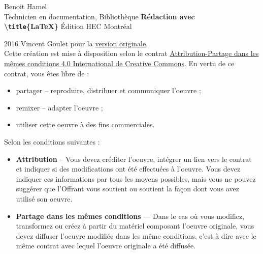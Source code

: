 
\begin{frame}
	
	{\footnotesize Benoit Hamel \\
	Technicien en documentation, Bibliothèque}
	\vfill
	{\Huge\bfseries Rédaction avec \\
	\textbackslash \texttt{title}\{\textrm{\LaTeX}\}}
	\vfill
	{\footnotesize Édition HEC Montréal}
	
\end{frame}


\begin{frame}
	
	\footnotesize
	{\faCopyright} 2016 Vincent Goulet pour la \href{https://ctan.org/pkg/formation-latex-ul}{version originale}.
	\\[2ex]
	{\faCreativeCommons} Cette création est mise à disposition selon le contrat
	\href{http://creativecommons.org/licenses/by-sa/4.0/deed.fr}%
	{Attribution-Partage dans les mêmes conditions 4.0 International de Creative Commons}.
	En vertu de ce contrat, vous êtes libre de :
	
	\begin{itemize}
		\item partager -- reproduire, distribuer et communiquer l’oeuvre ;
		\item remixer -- adapter l’oeuvre ;
		\item utiliser cette oeuvre à des fins commerciales.
	\end{itemize}

	Selon les conditions suivantes :
	
	\begin{itemize}
		\item \textbf{Attribution} -- Vous devez créditer l’oeuvre, intégrer un lien vers le contrat et indiquer si des modifications ont été effectuées	à l’oeuvre. Vous devez indiquer ces informations par tous les moyens possibles, mais vous ne pouvez suggérer que l’Offrant vous soutient ou soutient la façon dont vous avez utilisé son oeuvre.
		\item \textbf{Partage dans les mêmes conditions} — Dans le cas où vous modifiez, transformez ou créez à partir du matériel composant l’oeuvre originale, vous devez diffuser l’oeuvre modifiée dans les même conditions, c’est à dire avec le même contrat avec	lequel l’oeuvre originale a été diffusée.
	\end{itemize}

\end{frame}